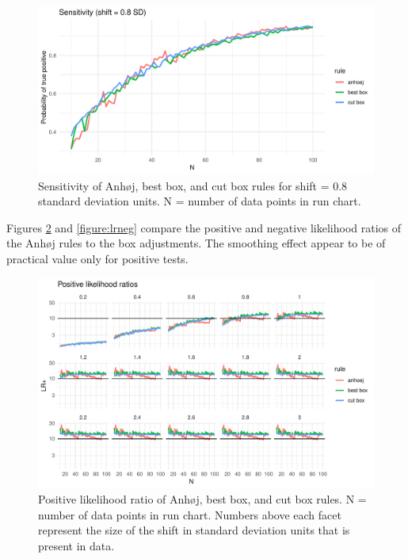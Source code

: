 \begin{figure}[htbp]
  \centering
  \includegraphics[width=\textwidth]{fig_sens.pdf}
  \caption{Sensitivity of Anhøj, best box, and cut box rules for shift = 0.8
           standard deviation units.
           N = number of data points in run chart.}
  \label{figure:sens}
\end{figure}

Figures \ref{figure:lrpos} and \ref{figure:lrneg} compare the positive
and negative likelihood ratios of the Anhøj rules to the box
adjustments. The smoothing effect appear to be of practical value only
for positive tests.

\begin{figure}[htbp]
  \centering
  \includegraphics[width=\textwidth]{fig_lrpos.pdf}
  \caption{Positive likelihood ratio of Anhøj, best box, and cut box rules.
           N = number of data points in run chart.
           Numbers above each facet represent the size of the shift in standard
           deviation units that is present in data.}
  \label{figure:lrpos}
\end{figure}

